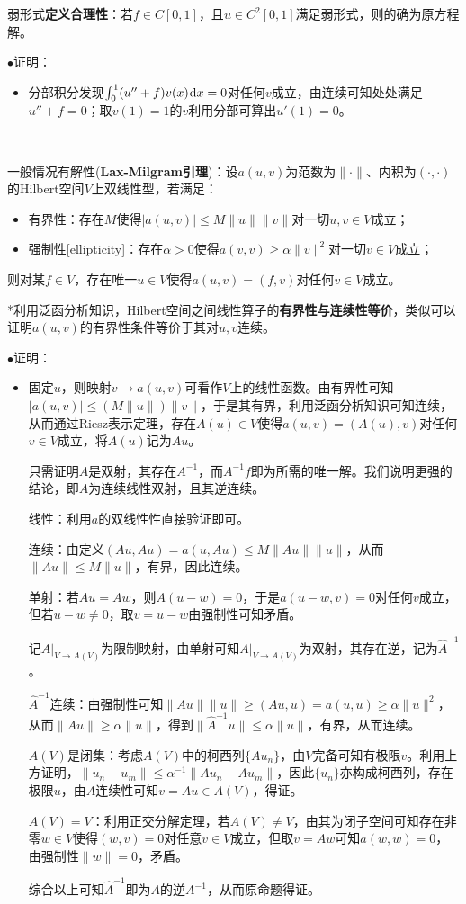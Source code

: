 \documentclass[a4paper,UTF8,fontset=windows]{ctexart}
\newcommand*{\dr}{\hspace{0.07em}\mathrm{d}}
\newcommand{\proo}[1]{{\kaishu $\bullet$证明：
\begin{itemize}
    \item[] #1
\end{itemize}
}}
\begin{document}
弱形式\textbf{定义合理性}：若$f\in C[0,1]$，且$u\in C^2[0,1]$满足弱形式，则的确为原方程解。

\proo{
    分部积分发现$\int_0^1(u''+f)v(x)\dr x=0$对任何$v$成立，由连续可知处处满足$u''+f=0$；取$v(1)=1$的$v$利用分部可算出$u'(1)=0$。
}

\

一般情况有解性(\textbf{Lax-Milgram引理})：设$a(u,v)$为范数为$\|\cdot\|$、内积为$(\cdot,\cdot)$的Hilbert空间$V$上双线性型，若满足：
\begin{itemize}
    \item 有界性：存在$M$使得$|a(u,v)|\le M\|u\|\|v\|$对一切$u,v\in V$成立；
    \item 强制性[ellipticity]：存在$\alpha>0$使得$a(v,v)\ge\alpha\|v\|^2$对一切$v\in V$成立；
\end{itemize}
则对某$f\in V$，存在唯一$u\in V$使得$a(u,v)=(f,v)$对任何$v\in V$成立。

*利用泛函分析知识，Hilbert空间之间线性算子的\textbf{有界性与连续性等价}，类似可以证明$a(u,v)$的有界性条件等价于其对$u,v$连续。

\proo{
    固定$u$，则映射$v\to a(u,v)$可看作$V$上的线性函数。由有界性可知$|a(u,v)|\le(M\|u\|)\|v\|$，于是其有界，利用泛函分析知识可知连续，从而通过Riesz表示定理，存在$A(u)\in V$使得$a(u,v)=(A(u),v)$对任何$v\in V$成立，将$A(u)$记为$Au$。

    只需证明$A$是双射，其存在$A^{-1}$，而$A^{-1}f$即为所需的唯一解。我们说明更强的结论，即$A$为连续线性双射，且其逆连续。

    线性：利用$a$的双线性性直接验证即可。

    连续：由定义$(Au,Au)=a(u,Au)\le M\|Au\|\|u\|$，从而$\|Au\|\le M\|u\|$，有界，因此连续。

    单射：若$Au=Aw$，则$A(u-w)=0$，于是$a(u-w,v)=0$对任何$v$成立，但若$u-w\ne 0$，取$v=u-w$由强制性可知矛盾。

    记$A\big|_{V\to A(V)}$为限制映射，由单射可知$A\big|_{V\to A(V)}$为双射，其存在逆，记为$\hat{A}^{-1}$。

    $\hat{A}^{-1}$连续：由强制性可知$\|Au\|\|u\|\ge(Au,u)=a(u,u)\ge\alpha\|u\|^2$，从而$\|Au\|\ge\alpha\|u\|$，得到$\|\hat{A}^{-1}u\|\le\alpha\|u\|$，有界，从而连续。

    $A(V)$是闭集：考虑$A(V)$中的柯西列$\{Au_n\}$，由$V$完备可知有极限$v$。利用上方证明，$\|u_n-u_m\|\le\alpha^{-1}\|Au_n-Au_m\|$，因此$\{u_n\}$亦构成柯西列，存在极限$u$，由$A$连续性可知$v=Au\in A(V)$，得证。

    $A(V)=V$：利用正交分解定理，若$A(V)\ne V$，由其为闭子空间可知存在非零$w\in V$使得$(w,v)=0$对任意$v\in V$成立，但取$v=Aw$可知$a(w,w)=0$，由强制性$\|w\|=0$，矛盾。

    综合以上可知$\hat{A}^{-1}$即为$A$的逆$A^{-1}$，从而原命题得证。
}
    
\end{document}
